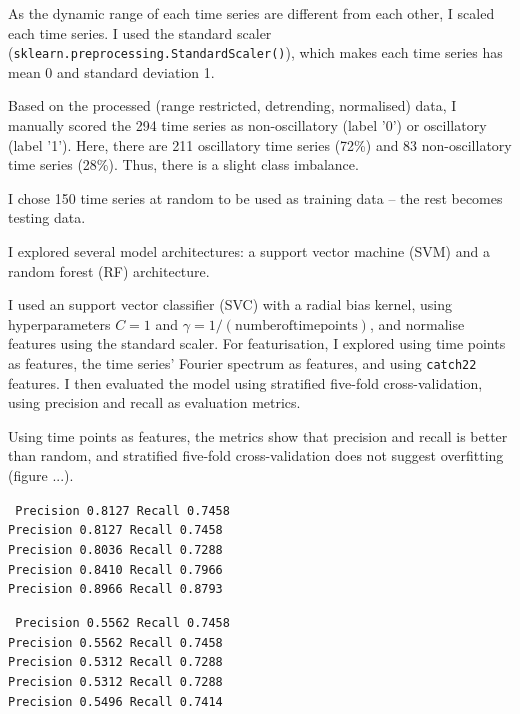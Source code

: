 As the dynamic range of each time series are different from each other, I scaled each time series.
I used the standard scaler (\texttt{sklearn.preprocessing.StandardScaler()}), which makes each time series has mean 0 and standard deviation 1.


Based on the processed (range restricted, detrending, normalised) data, I manually scored the 294 time series as non-oscillatory (label '0') or oscillatory (label '1').
Here, there are 211 oscillatory time series (72\%) and 83 non-oscillatory time series (28\%).
Thus, there is a slight class imbalance.


I chose 150 time series at random to be used as training data -- the rest becomes testing data.


I explored several model architectures: a support vector machine (SVM) and a random forest (RF) architecture.

I used an support vector classifier (SVC) with a radial bias kernel, using hyperparameters $C = 1$ and $\gamma = 1/(\mathrm{number of time points})$, and normalise features using the standard scaler.
For featurisation, I explored using time points as features, the time series' Fourier spectrum as features, and using \texttt{catch22} features.
I then evaluated the model using stratified five-fold cross-validation, using precision and recall as evaluation metrics.

Using time points as features, the metrics show that precision and recall is better than random, and stratified
five-fold cross-validation does not suggest overfitting (figure ...).

\texttt{
     Precision 0.8127 Recall 0.7458\\
     Precision 0.8127 Recall 0.7458\\
     Precision 0.8036 Recall 0.7288\\
     Precision 0.8410 Recall 0.7966\\
     Precision 0.8966 Recall 0.8793\\
}

\texttt{
     Precision 0.5562 Recall 0.7458\\
     Precision 0.5562 Recall 0.7458\\
     Precision 0.5312 Recall 0.7288\\
     Precision 0.5312 Recall 0.7288\\
     Precision 0.5496 Recall 0.7414\\
}

